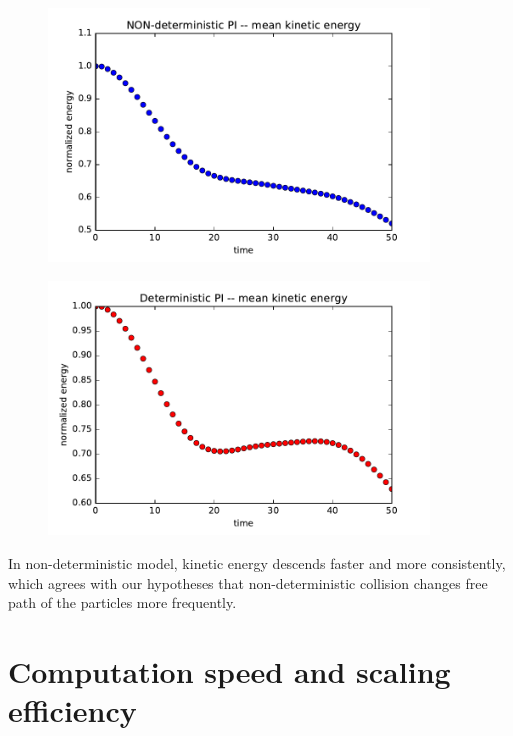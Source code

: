\begin{figure}[H]
 \centering 
 \includegraphics[width=0.9\textwidth]{./img/tgv_nonex}
\end{figure}

\begin{figure}[H]
 \centering 
 \includegraphics[width=0.9\textwidth]{./img/tgv_detox}
\end{figure}

In non-deterministic model, kinetic energy descends faster and more consistently, which agrees with our hypotheses that non-deterministic collision changes free path of the particles more frequently.

\section{Computation speed and scaling efficiency}
